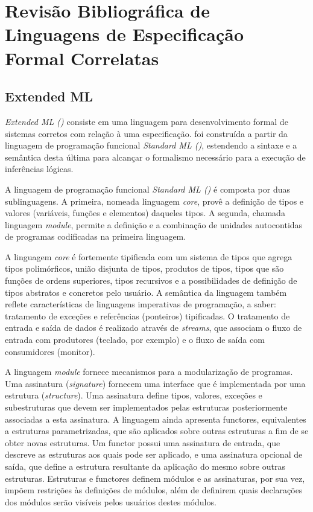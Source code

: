 \chapter{Revisão Bibliográfica de Linguagens de Especificação Formal Correlatas}
\label{chap:revisaobib}

\section{Extended ML}\label{chap:revisaobib:eml}

\textit{Extended ML (\EML)} \cite{MLDefIntro} consiste em uma linguagem para desenvolvimento formal de sistemas corretos com relação à uma especificação.
\EML foi construída a partir da linguagem de programação funcional \textit{Standard ML (\SML)}, estendendo a sintaxe e a semântica desta última para alcançar o formalismo necessário para a execução de inferências lógicas.

A linguagem de programação funcional \textit{Standard ML (\SML)} é composta por duas sublinguagens.
A primeira, nomeada linguagem \textit{core}, provê a definição de tipos e valores (variáveis, funções e elementos) daqueles tipos.
A segunda, chamada linguagem \textit{module}, permite a definição e a combinação de unidades autocontidas de programas codificadas na primeira linguagem.

A linguagem \textit{core} é fortemente tipificada com um sistema de tipos que agrega tipos polimórficos, união disjunta de tipos, produtos de tipos, tipos que são funções de ordens superiores, tipos recursivos e a possibilidades de definição de tipos abstratos e concretos pelo usuário.
A semântica da linguagem também reflete características de linguagens imperativas de programação, a saber: tratamento de exceções e referências (ponteiros) tipificadas.
O tratamento de entrada e saída de dados é realizado através de \textit{streams}, que associam o fluxo de entrada com produtores (teclado, por exemplo) e o fluxo de saída com consumidores (monitor).

A linguagem \textit{module} fornece mecanismos para a modularização de programas.
Uma assinatura (\textit{signature}) fornecem uma interface que é implementada por uma estrutura (\textit{structure}).
Uma assinatura define tipos, valores, exceções e subestruturas que devem ser implementados pelas estruturas posteriormente associadas a esta assinatura.
A linguagem ainda apresenta functores, equivalentes a estruturas parametrizadas, que são aplicados sobre outras estruturas a fim de se obter novas estruturas.
Um functor possui uma assinatura de entrada, que descreve as estruturas aos quais pode ser aplicado, e uma assinatura opcional de saída, que define a estrutura resultante da aplicação do mesmo sobre outras estruturas.
Estruturas e functores definem módulos e as assinaturas, por sua vez, impõem restrições às definições de módulos, além de definirem quais declarações dos módulos serão visíveis pelos usuários destes módulos.

